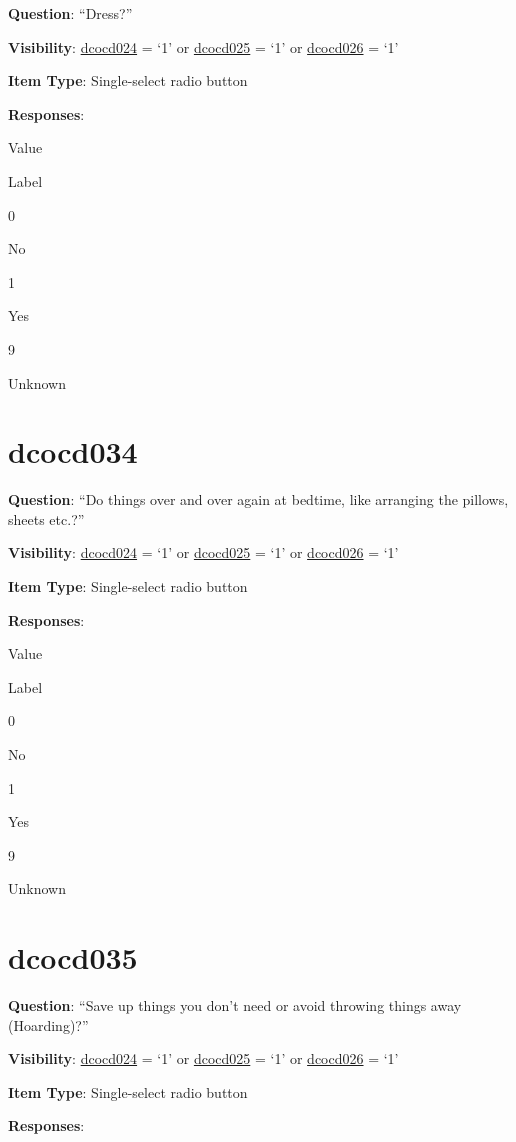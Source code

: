 \documentclass[]{book}
\begin{document}
\textbf{Question}: ``Dress?''

\textbf{Visibility}: \protect\hyperlink{dcocd024}{dcocd024} = `1' or \protect\hyperlink{dcocd025}{dcocd025} = `1' or \protect\hyperlink{dcocd026}{dcocd026} = `1'

\textbf{Item Type}: Single-select radio button

\textbf{Responses}:

Value

Label

0

No

1

Yes

9

Unknown

\hypertarget{dcocd034}{%
\section{dcocd034}\label{dcocd034}}

\textbf{Question}: ``Do things over and over again at bedtime, like arranging the pillows, sheets etc.?''

\textbf{Visibility}: \protect\hyperlink{dcocd024}{dcocd024} = `1' or \protect\hyperlink{dcocd025}{dcocd025} = `1' or \protect\hyperlink{dcocd026}{dcocd026} = `1'

\textbf{Item Type}: Single-select radio button

\textbf{Responses}:

Value

Label

0

No

1

Yes

9

Unknown

\hypertarget{dcocd035}{%
\section{dcocd035}\label{dcocd035}}

\textbf{Question}: ``Save up things you don't need or avoid throwing things away (Hoarding)?''

\textbf{Visibility}: \protect\hyperlink{dcocd024}{dcocd024} = `1' or \protect\hyperlink{dcocd025}{dcocd025} = `1' or \protect\hyperlink{dcocd026}{dcocd026} = `1'

\textbf{Item Type}: Single-select radio button

\textbf{Responses}:
\end{document}

